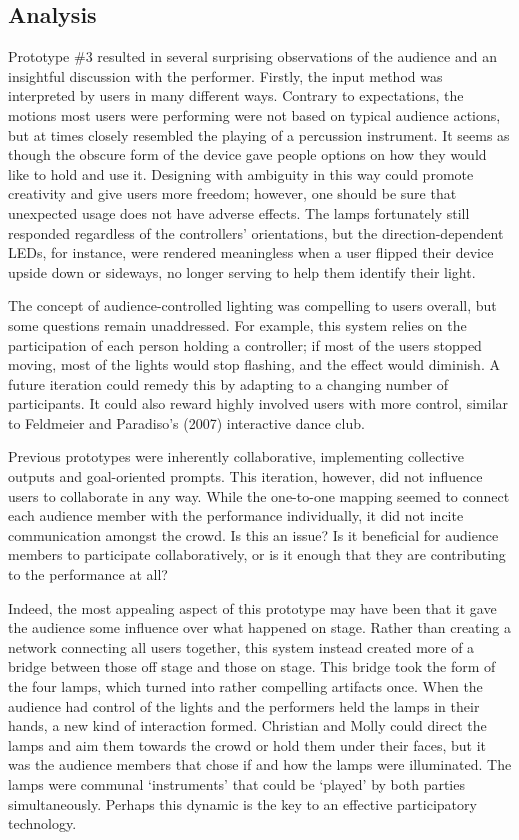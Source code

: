 \subsection{Analysis}


Prototype \#3 resulted in several surprising observations of the audience and an insightful discussion with the performer. Firstly, the input method was interpreted by users in many different ways. Contrary to expectations, the motions most users were performing were not based on typical audience actions, but at times closely resembled the playing of a percussion instrument. It seems as though the obscure form of the device gave people options on how they would like to hold and use it. Designing with ambiguity in this way could promote creativity and give users more freedom; however, one should be sure that unexpected usage does not have adverse effects. The lamps fortunately still responded regardless of the controllers' orientations, but the direction-dependent LEDs, for instance, were rendered meaningless when a user flipped their device upside down or sideways, no longer serving to help them identify their light.

The concept of audience-controlled lighting was compelling to users overall, but some questions remain unaddressed. For example, this system relies on the participation of each person holding a controller; if most of the users stopped moving, most of the lights would stop flashing, and the effect would diminish. A future iteration could remedy this by adapting to a changing number of participants. It could also reward highly involved users with more control, similar to Feldmeier and Paradiso's (2007) interactive dance club.

Previous prototypes were inherently collaborative, implementing collective outputs and goal-oriented prompts. This iteration, however, did not influence users to collaborate in any way. While the one-to-one mapping seemed to connect each audience member with the performance individually, it did not incite communication amongst the crowd. Is this an issue? Is it beneficial for audience members to participate collaboratively, or is it enough that they are contributing to the performance at all?

Indeed, the most appealing aspect of this prototype may have been that it gave the audience some influence over what happened on stage. Rather than creating a network connecting all users together, this system instead created more of a bridge between those off stage and those on stage. This bridge took the form of the four lamps, which turned into rather compelling artifacts once. When the audience had control of the lights and the performers held the lamps in their hands, a new kind of interaction formed. Christian and Molly could direct the lamps and aim them towards the crowd or hold them under their faces, but it was the audience members that chose if and how the lamps were illuminated. The lamps were communal `instruments' that could be `played' by both parties simultaneously. Perhaps this dynamic is the key to an effective participatory technology.

